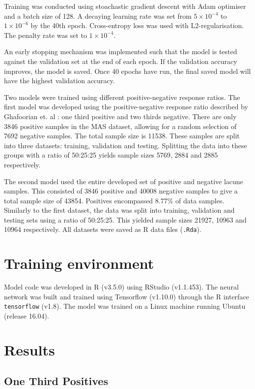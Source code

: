 Training was conducted using stoachastic gradient descent with Adam optimiser and a batch size of 128. A decaying learning rate was set from $5\times10^{-4}$ to $1\times10^{-6}$ by the 40th epoch. Cross-entropy loss was used with L2-regularisation. The penalty rate was set to $1\times10^{-4}$. 

An early stopping mechanism was implemented such that the model is tested against the validation set at the end of each epoch. If the validation accuracy improves, the model is saved. Once 40 epochs have run, the final saved model will have the highest validation accuracy.

Two models were trained using different positive-negative response ratios. The first model was developed using the positive-negative response ratio described by Ghafoorian et. al \cite{GhafoorianM.2017Dml3}: one third positive and two thirds negative. There are only 3846 positive samples in the MAS dataset, allowing for a random selection of 7692 negative samples. The total sample size is 11538. These samples are split into three datasets: training, validation and testing. Splitting the data into these groups with a ratio of 50:25:25 yields sample sizes 5769, 2884 and 2885 respectively.

The second model used the entire developed set of positive and negative lacune samples. This consisted of 3846 positive and 40008 negative samples to give a total sample size of 43854. Positives encompassed 8.77\% of data samples. Similarly to the first dataset, the data was split into training, validation and testing sets using a ratio of 50:25:25. This yielded sample sizes 21927, 10963 and 10964 respectively. All datasets were saved as R data files (\texttt{.Rda}).


\section{Training environment}

Model code was developed in R (v3.5.0) using RStudio (v1.1.453). The neural network was built and trained using Tensorflow (v1.10.0) through the R interface \texttt{tensorflow} (v1.8). The model was trained on a Linux machine running Ubuntu (release 16.04). 

\section{Results}

\subsection*{One Third Positives}

